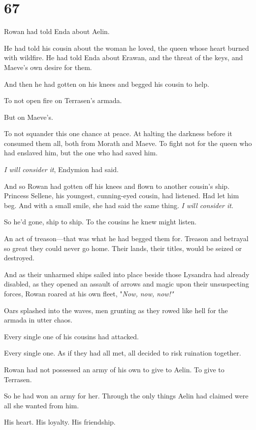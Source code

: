
\chapter{67}

Rowan had told Enda about Aelin.

He had told his cousin about the woman he loved, the queen whose heart burned with wildfire.
He had told Enda about Erawan, and the threat of the keys, and Maeve's own desire for them.

And then he had gotten on his knees and begged his cousin to help.

To not open fire on Terrasen's armada.

But on Maeve's.

To not squander this one chance at peace.
At halting the darkness before it consumed them all, both from Morath and Maeve.
To fight not for the queen who had enslaved him, but the one who had saved him.

\emph{I will consider it}, Endymion had said.

And so Rowan had gotten off his knees and flown to another cousin's ship.
Princess Sellene, his youngest, cunning-eyed cousin, had listened.
Had let him beg.
And with a small smile, she had said the same thing.
\emph{I will consider it}.

So he'd gone, ship to ship.
To the cousins he knew might listen.

An act of treason---that was what he had begged them for.
Treason and betrayal so great they could never go home.
Their lands, their titles, would be seized or destroyed.

And as their unharmed ships sailed into place beside those Lysandra had already disabled, as they opened an assault of arrows and magic upon their unsuspecting forces, Rowan roared at his own fleet, "\emph{Now, now, now!"}

Oars splashed into the waves, men grunting as they rowed like hell for the armada in utter chaos.

Every single one of his cousins had attacked.

Every single one.
As if they had all met, all decided to risk ruination together.

Rowan had not possessed an army of his own to give to Aelin.
To give to Terrasen.

So he had won an army for her.
Through the only things Aelin had claimed were all she wanted from him.

His heart.
His loyalty.
His friendship.

